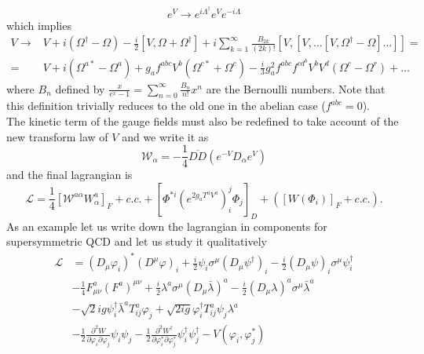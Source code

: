 \documentclass[12pt]{article}
\begin{document}
\begin{equation*}
  e^V \to e^{i\Lambda^\dagger} e^V e^{-i\Lambda}
\end{equation*}
which implies 
\begin{align*}
  V \rightarrow &V + i\left(\Omega^{\dagger}-\Omega\right)-\frac{i}{2}\left[V, \Omega+\Omega^{\dagger}\right] 
  + i \sum_{k=1}^{\infty} \frac{B_{2 k}}{(2 k) !}\left[V,\left[V, \ldots\left[V, \Omega^{\dagger}-\Omega\right] \ldots\right]\right] = \\
  = & V + i\left(\Omega^{a *}-\Omega^{a}\right)+g_{a} f^{a b c} V^{b}\left(\Omega^{c *}+\Omega^{c}\right) 
  -\frac{i}{3} g_{a}^{2} f^{a b c} f^{c d^{b}} V^{b} V^{d}\left(\Omega^{c}-\Omega^{r}\right)+\ldots
\end{align*}
where $B_n$ defined by $\frac{x}{e^{x}-1}=\sum_{n=0}^{\infty} \frac{B_{n}}{n !} x^{n}$ are the Bernoulli numbers. Note that this definition trivially reduces to the old one in the abelian case ($f^{abc}=0$). \\
The kinetic term of the gauge fields must also be redefined to take account of the new transform law of $V$ and we write it as 
\begin{equation*}
  \mathcal{W}_\alpha = -\frac{1}{4} \overline{DD} (e^{-V}D_{\alpha}e^V)
\end{equation*}
and the final lagrangian is 
\begin{equation*}
  \mathcal{L}=\frac{1}{4}\left[\mathcal{W}^{a \alpha} W_{\alpha}^{a}\right]_{F}+c . c .+\left[\Phi^{*i}\left(e^{2 g_a T^{a} V^{a}}\right)_{i}^j \Phi_{j}\right]_{D}+\left(\left[W\left(\Phi_{i}\right)\right]_F+c . c .\right) .
\end{equation*}
As an example let us write down the lagrangian in components for supersymmetric QCD and let us study it qualitatively
\begin{equation*}
  \begin{aligned}
      \mathcal{L} &=\left(D_{\mu} \varphi_{i}\right)^{*}\left(D^{\mu} \varphi\right)_{i}+\frac{i}{2} \psi_{i} \sigma^{\mu}\left(D_{\mu} \psi^{\dagger}\right)_{i}-\frac{i}{2}\left(D_{\mu} \psi\right)_{i} \sigma^{\mu} \psi^{\dagger}_{i}\\
      &-\frac{1}{4} F_{\mu \nu}^{a}\left(F^{a}\right)^{\mu \nu}+\frac{i}{2} \lambda^{a} \sigma^{\mu}\left(D_{\mu} \bar{\lambda}\right)^{a}-\frac{i}{2}\left(D_{\mu} \lambda\right)^{a} \sigma^{\mu} \bar{\lambda}^{a} \\
      &-\sqrt{2} i g \psi^{\dagger}_{i} \bar{\lambda}^{a} T_{i j}^{a} \varphi_{j}+\sqrt{2 i g} \varphi_{i}^{\dagger} T_{i j}^{a} \psi_{j} \lambda^{a} \\
      &-\frac{1}{2} \frac{\partial^{2} W}{\partial \varphi_{i} \partial \varphi_{j}} \psi_{i} \psi_{j}-\frac{1}{2} \frac{\partial^{2} W^{\dagger}}{\partial \varphi_{i}^{*} \partial \varphi_{j}^{*}} \psi^{\dagger}_{i} \psi^{\dagger}_{j}-V\left(\varphi_{i}, \varphi_{j}^{*}\right)
      \end{aligned}
\end{equation*}
\end{document}
